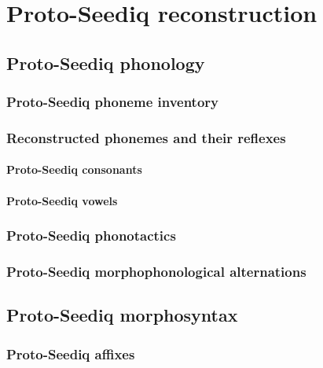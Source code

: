 \chapter{Proto-Seediq reconstruction}\label{ch4}
\lipsum[1-2]

\section{Proto-Seediq phonology}
\lipsum[1]

\subsection{Proto-Seediq phoneme inventory}
\lipsum[1]

\subsection{Reconstructed phonemes and their reflexes}
\lipsum[1]

\subsubsection{Proto-Seediq consonants} \label{sec:psedC}
\lipsum[1]

\subsubsection{Proto-Seediq vowels} \label{sec:psedV}
\lipsum[1]

\subsection{Proto-Seediq phonotactics}
\lipsum[1]

\subsection{Proto-Seediq morphophonological alternations} \label{sec:psed_alter}
\lipsum[1]


\section{Proto-Seediq morphosyntax}
\lipsum[1]

\subsection{Proto-Seediq affixes}
\lipsum[1]

